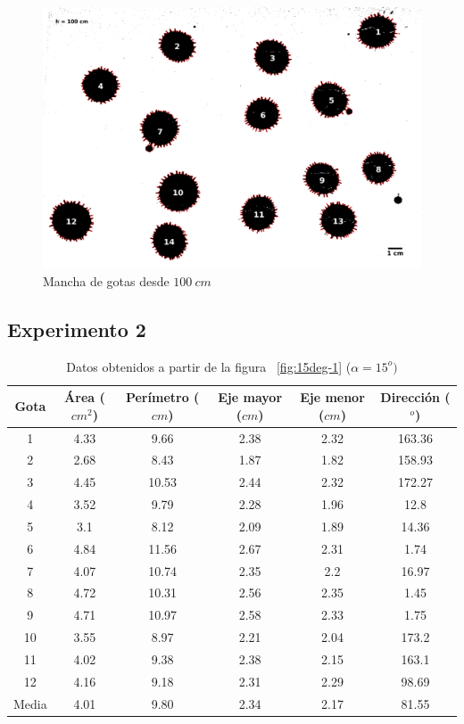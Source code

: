 \begin{figure}[H] \centering
\includegraphics[width=0.90\linewidth]{src/100-1.png} \caption{Mancha de gotas
desde $100\ cm$} \label{fig:100-1} \end{figure}

\pagebreak \subsection{Experimento 2} \label{sub:experimento_2}

\begin{table}[H] \centering \caption{Datos obtenidos a partir de la figura
    ~\ref{fig:15deg-1} ($\alpha=15^o)$} \label{tab:15deg}
    \begin{tabular}{cccccc} \toprule Gota & Área ($cm^2$) & Perímetro ($cm$) &
        Eje mayor ($cm$) & Eje menor ($cm$) & Dirección ($^o$) \\ \midrule 1  &
        4.33 & 9.66  & 2.38 & 2.32 & 163.36 \\ 2  & 2.68 & 8.43  & 1.87 & 1.82
             & 158.93 \\ 3  & 4.45 & 10.53 & 2.44 & 2.32 & 172.27 \\ 4  & 3.52
             & 9.79  & 2.28 & 1.96 & 12.8   \\ 5  & 3.1  & 8.12  & 2.09 & 1.89
             & 14.36  \\ 6  & 4.84 & 11.56 & 2.67 & 2.31 & 1.74   \\ 7  & 4.07
             & 10.74 & 2.35 & 2.2  & 16.97  \\ 8  & 4.72 & 10.31 & 2.56 & 2.35
             & 1.45   \\ 9  & 4.71 & 10.97 & 2.58 & 2.33 & 1.75   \\ 10 & 3.55
             & 8.97  & 2.21 & 2.04 & 173.2  \\ 11 & 4.02 & 9.38  & 2.38 & 2.15
             & 163.1  \\ 12 & 4.16 & 9.18  & 2.31 & 2.29 & 98.69  \\ \midrule
        Media & 4.01 & 9.80  & 2.34 & 2.17 & 81.55 \\ \bottomrule \end{tabular}
    \end{table}

